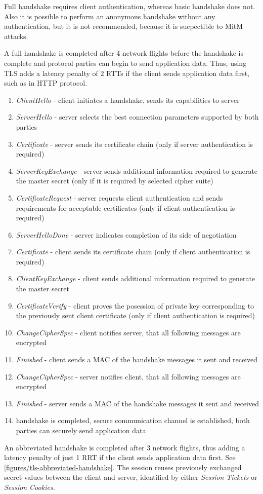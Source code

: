 Full handshake requires client authentication, whereas basic handshake does not. Also it is possible to perform an anonymous handshake without any authentication, but it is not recommended, because it is sucpectible to MitM attacks.

A full handshake is completed after 4 network flights before the handshake is complete and protocol parties can begin to send application data. Thus, using TLS adds a latency penalty of 2 RTTs if the client sends application data first, such as in HTTP protocol.

\begin{enumerate}
  \item \textit{ClientHello} - client initiates a handshake, sends its capabilities to server
  \item \textit{ServerHello} - server selects the best connection parameters supported by both parties
  \item \textit{Certificate} - server sends its certificate chain (only if server authentication is required)
  \item \textit{ServerKeyExchange} - server sends additional information required to generate the master secret (only if it is required by selected cipher suite)
  \item \textit{CertificateRequest} - server requests client authentication and sends requirements for acceptable certificates (only if client authentication is required)
  \item \textit{ServerHelloDone} - server indicates completion of its side of negotiation
  \item \textit{Certificate} - client sends its certificate chain (only if client authentication is required)
  \item \textit{ClientKeyExchange} - client sends additional information required to generate the master secret
  \item \textit{CertificateVerify} - client proves the posession of private key corresponding to the previously sent client certificate (only if client authentication is required)
  \item \textit{ChangeCipherSpec} - client notifies server, that all following messages are encrypted
  \item \textit{Finished} - client sends a MAC of the handshake messages it sent and received
  \item \textit{ChangeCipherSpec} - server notifies client, that all following messages are encrypted
  \item \textit{Finished} - server sends a MAC of the handshake messages it sent and received
  \item handshake is completed, secure communication channel is established, both parties can securely send application data
\end{enumerate}

An abbreviated handshake is completed after 3 network flights, thus adding a latency penalty of just 1 RRT if the client sends application data first. See \autoref{figures/tls-abbreviated-handshake}. The session reuses previously exchanged secret values between the client and server, identified by either \textit{Session Tickets} or \textit{Session Cookies}.
